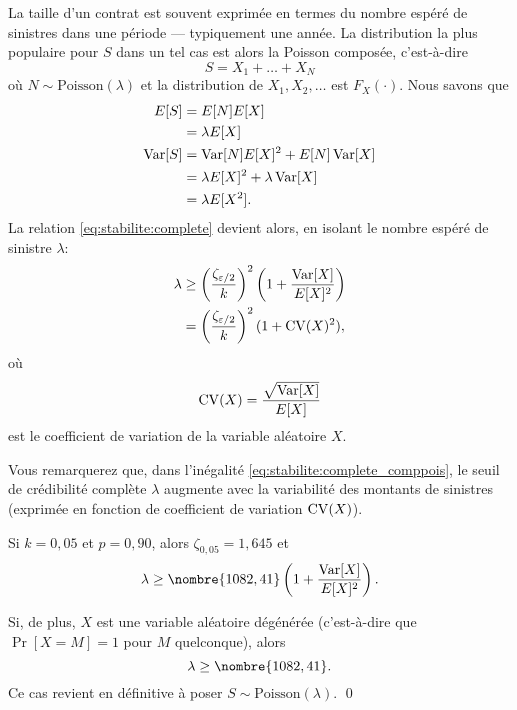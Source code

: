 \begin{exemple}
  \label{exemple:stabilite:comppois}
  La taille d'un contrat est souvent exprimée en termes du nombre
  espéré de sinistres dans une période --- typiquement une année. La
  distribution la plus populaire pour $S$ dans un tel cas est alors la
  Poisson composée, c'est-à-dire
  \begin{equation*}
    S = X_1 + \dots + X_N
  \end{equation*}
  où $N \sim \text{Poisson}(\lambda)$ et la distribution de $X_1, X_2,
  \dots$ est $F_X(\cdot)$. Nous savons que
  \begin{align*}
    E [ S ]
    &= E [ N ] E [ X ] \\
    &= \lambda E [ X ] \\
    \operatorname{Var} [ S ]
    &= \operatorname{Var} [ N ] E [ X ]^2 + E [ N ] \operatorname{Var} [ X ] \\
    &= \lambda E [ X ]^2 + \lambda \operatorname{Var} [ X ] \\
    &= \lambda E [ X^2 ].
  \end{align*}
  La relation \eqref{eq:stabilite:complete} devient alors, en isolant
  le nombre espéré de sinistre $\lambda$:
  \begin{equation}
    \label{eq:stabilite:complete_comppois}
    \begin{split}
      \lambda
      &\geq
      \left(
        \frac{\zeta_{\varepsilon/2}}{k}
      \right)^2
      \left(
        1 + \frac{\operatorname{Var} [ X ]}{E [ X ]^2}
      \right) \\
      &=
      \left(
        \frac{\zeta_{\varepsilon/2}}{k}
      \right)^2
      (1 + \operatorname{CV}(X)^2),
    \end{split}
  \end{equation}
  où
  \begin{equation*}
    \operatorname{CV}(X) = \frac{\sqrt{\operatorname{Var} [ X ]}}{E [ X ]}
  \end{equation*}
  est le coefficient de variation de la variable aléatoire $X$.

  Vous remarquerez que, dans l'inégalité
  \eqref{eq:stabilite:complete_comppois}, le seuil de crédibilité
  complète $\lambda$ augmente avec la variabilité des montants de
  sinistres (exprimée en fonction de coefficient de variation
  $\operatorname{CV}(X)$).

  Si $k = 0,05$ et $p = 0,90$, alors $\zeta_{0,05} = 1,645$ et
  \begin{equation*}
    \lambda
    \geq
    \nombre{1082,41}
    \left(
      1 + \frac{\var{X}}{\esp{X}^2}
    \right).
  \end{equation*}

  Si, de plus, $X$ est une variable aléatoire dégénérée (c'est-à-dire
  que $\Pr[X = M] = 1$ pour $M$ quelconque), alors
  \begin{equation*}
    \lambda \geq \nombre{1082,41}.
  \end{equation*}
  Ce cas revient en définitive à poser
  $S \sim \text{Poisson}(\lambda)$. %
  \qed
\end{exemple}

